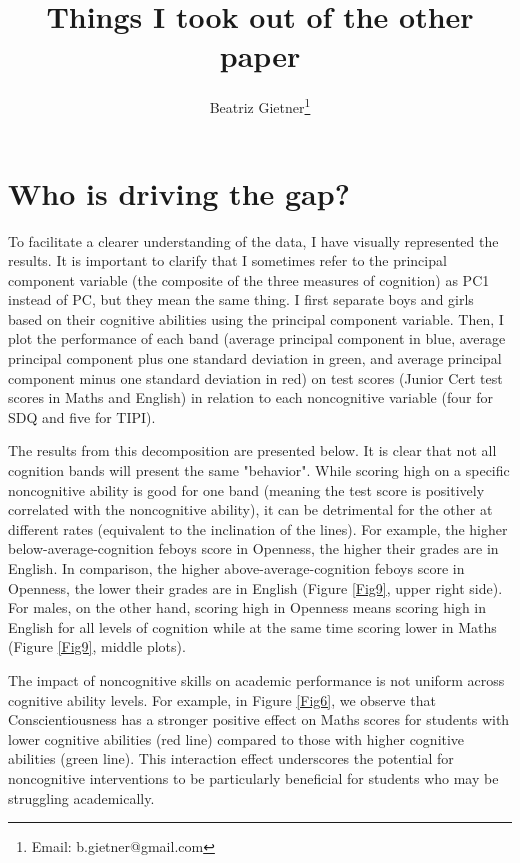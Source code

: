 \documentclass[12pt,a4paper,onecolumn]{article}
\title{\vspace{-2cm}\Large\textbf{Things I took out of the other paper}}
\author[]{Beatriz Gietner\thanks{Email: b.gietner@gmail.com}}
\affil{University College Dublin}
\date{}
\numberwithin{equation}{section}
\begin{document}
\maketitle

\section{Who is driving the gap?}

To facilitate a clearer understanding of the data, I have visually represented the results. It is important to clarify that I sometimes refer to the principal component variable (the composite of the three measures of cognition) as PC1 instead of PC, but they mean the same thing. I first separate boys and girls based on their cognitive abilities using the principal component variable. Then, I plot the performance of each band (average principal component in blue, average principal component plus one standard deviation in green, and average principal component minus one standard deviation in red) on test scores (Junior Cert test scores in Maths and English) in relation to each noncognitive variable (four for SDQ and five for TIPI).

The results from this decomposition are presented below. It is clear that not all cognition bands will present the same "behavior". While scoring high on a specific noncognitive ability is good for one band (meaning the test score is positively correlated with the noncognitive ability), it can be detrimental for the other at different rates (equivalent to the inclination of the lines). For example, the higher below-average-cognition feboys score in Openness, the higher their grades are in English. In comparison, the higher above-average-cognition feboys score in Openness, the lower their grades are in English (Figure \ref{Fig9}, upper right side). For males, on the other hand, scoring high in Openness means scoring high in English for all levels of cognition while at the same time scoring lower in Maths (Figure \ref{Fig9}, middle plots). 

The impact of noncognitive skills on academic performance is not uniform across cognitive ability levels. For example, in Figure \ref{Fig6}, we observe that Conscientiousness has a stronger positive effect on Maths scores for students with lower cognitive abilities (red line) compared to those with higher cognitive abilities (green line). This interaction effect underscores the potential for noncognitive interventions to be particularly beneficial for students who may be struggling academically.
\end{document}
